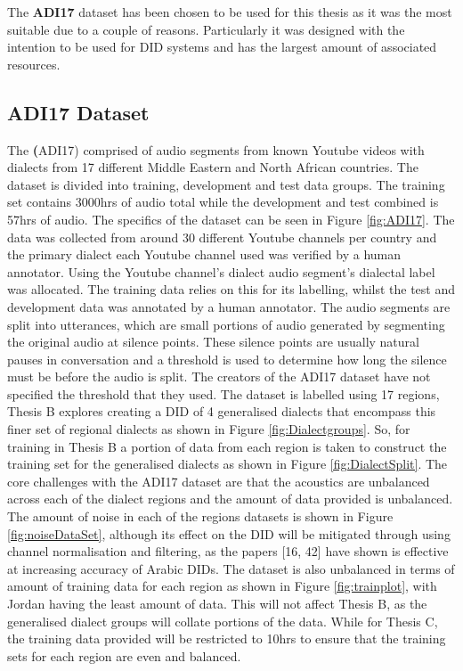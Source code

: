 \pagebreak
The \textbf{ADI17} dataset has been chosen to be used for this thesis as it was the most 
suitable due to a couple of reasons. Particularly it was
designed with the intention to be used for DID systems and has the largest amount of 
associated resources. 

\subsection{ADI17 Dataset}
The \textbf(ADI17) comprised of audio segments from known Youtube videos with dialects from 17 different Middle Eastern and North
African countries. The dataset is divided into training, development and test data groups. The training set contains 
3000hrs of audio total while the development and test combined is 57hrs of audio. The specifics of the dataset can be seen in Figure \ref{fig:ADI17}.
The data was collected from around 30 different Youtube channels per country and the primary dialect each Youtube channel used was verified by a human annotator. Using the Youtube channel's 
dialect audio segment's dialectal label was allocated. The training data relies on this for its labelling, whilst 
the test and development data was annotated by a human annotator. The audio segments are split into utterances, which are small portions  
of audio generated by segmenting the original audio at silence points. These silence points are usually natural pauses in conversation and a threshold 
is used to determine how long the silence must be before the audio is split. The creators of the ADI17 dataset have not specified the threshold that they used. 
The dataset is labelled using 17 regions, Thesis B explores creating a DID of 4 generalised dialects that encompass this finer set of regional dialects as shown in Figure \ref{fig:Dialectgroups}. 
So, for training in Thesis B a portion of data from each region is taken to construct the training set for the generalised dialects as shown in Figure \ref{fig:DialectSplit}. 
The core challenges with the ADI17 dataset are that the acoustics are unbalanced across each of the dialect regions and the amount of data provided is unbalanced. The amount of noise in each of the 
regions datasets is shown in Figure \ref{fig:noiseDataSet}, although its effect on the DID will be mitigated through using channel normalisation and filtering, as the papers [16, 42] have shown is effective at increasing 
accuracy of Arabic DIDs. The dataset is also unbalanced in terms of amount of training data for each region as shown in Figure \ref{fig:trainplot}, with Jordan having the least amount of data. This will not affect Thesis B, as the generalised 
dialect groups will collate portions of the data. While for Thesis C, the training data provided will be restricted to 10hrs to ensure that 
the training sets for each region are even and balanced. 


